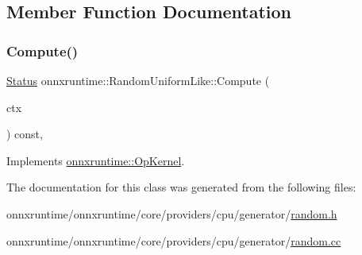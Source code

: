 \subsection{Member Function Documentation}
\mbox{\label{classonnxruntime_1_1RandomUniformLike_aa5c4616051d517ca64d6c605f88ca89e}} 
\subsubsection{\texorpdfstring{Compute()}{Compute()}}
{\footnotesize\ttfamily \mbox{\hyperlink{classonnxruntime_1_1common_1_1Status}{Status}} onnxruntime\+::\+Random\+Uniform\+Like\+::\+Compute (\begin{DoxyParamCaption}\item[{\mbox{\hyperlink{classonnxruntime_1_1OpKernelContext}{Op\+Kernel\+Context}} $\ast$}]{ctx }\end{DoxyParamCaption}) const\hspace{0.3cm}{\ttfamily [override]}, {\ttfamily [virtual]}}



Implements \mbox{\hyperlink{classonnxruntime_1_1OpKernel_a9eca8656a78b1b3ab9d3351a12798650}{onnxruntime\+::\+Op\+Kernel}}.



The documentation for this class was generated from the following files\+:\begin{DoxyCompactItemize}
\item 
onnxruntime/onnxruntime/core/providers/cpu/generator/\mbox{\hyperlink{random_8h}{random.\+h}}\item 
onnxruntime/onnxruntime/core/providers/cpu/generator/\mbox{\hyperlink{random_8cc}{random.\+cc}}\end{DoxyCompactItemize}
